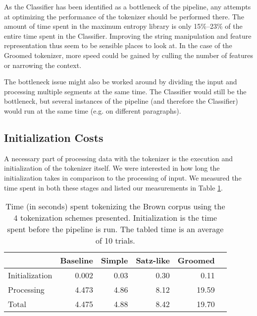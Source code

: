 As the Classifier has been identified as a bottleneck of the pipeline, any
attempts at optimizing the performance of the tokenizer should be performed
there. The amount of time spent in the maximum entropy library is only
15\%--23\% of the entire time spent in the Classifier. Improving the string
manipulation and feature representation thus seem to be sensible places to look
at. In the case of the Groomed tokenizer, more speed could be gained by culling
the number of features or narrowing the context.

The bottleneck issue might also be worked around by dividing the input and
processing multiple segments at the same time. The Classifier would still be
the bottleneck, but several instances of the pipeline (and therefore the
Classifier) would run at the same time (e.g. on different paragraphs).

\subsection{Initialization Costs}
\label{ssec:eval-spd-init}

A necessary part of processing data with the tokenizer is the execution and
initialization of the tokenizer itself. We were interested in how long the
initialization takes in comparison to the processing of input. We measured the
time spent in both these stages and listed our measurements in Table
\ref{tbl:timeline}.

\begin{table}
  \begin{center}
    \begin{tabular}{ | l | r | r | r | r | r | }
      \hline
      & Baseline & Simple & Satz-like & Groomed \\ \hline
      Initialization & 0.002 & 0.03 & 0.30 & 0.11 \\ \hline
      Processing & 4.473 & 4.86 & 8.12 & 19.59 \\ \hline
      Total & 4.475 & 4.88 & 8.42 & 19.70 \\
      \hline
    \end{tabular}
  \end{center}
  \caption[Time spent in individual initialization steps]
    {Time (in seconds) spent tokenizing the Brown corpus using the 4
    tokenization schemes presented. Initialization is the time spent before the
    pipeline is run. The tabled time is an average of 10 trials.}
  \label{tbl:timeline}
\end{table}

